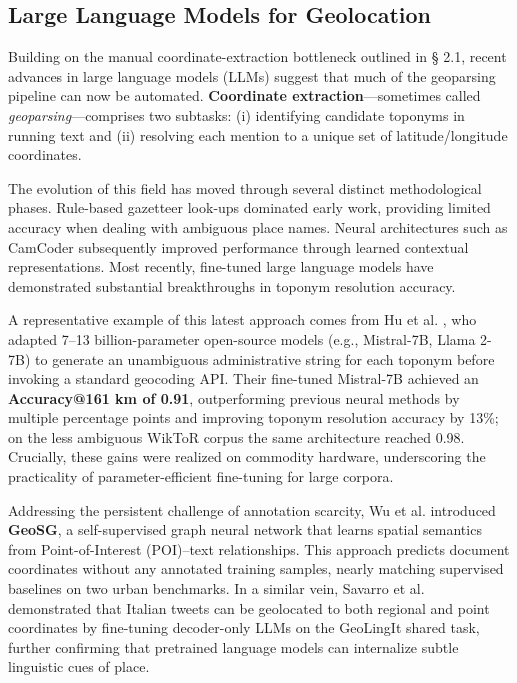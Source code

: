 \subsection{Large Language Models for
Geolocation}\label{large-language-models-for-geolocation}

Building on the manual coordinate-extraction bottleneck outlined in §
2.1, recent advances in large language models (LLMs) suggest that much
of the geoparsing pipeline can now be automated. \textbf{Coordinate
extraction}---sometimes called \emph{geoparsing}---comprises two
subtasks: (i) identifying candidate toponyms in running text and (ii)
resolving each mention to a unique set of latitude/longitude
coordinates.

The evolution of this field has moved through several distinct
methodological phases. Rule-based gazetteer look-ups dominated early
work, providing limited accuracy when dealing with ambiguous place
names. Neural architectures such as CamCoder \citep{Gritta2018_camcoder}
subsequently improved performance through learned contextual
representations. Most recently, fine-tuned large language models have
demonstrated substantial breakthroughs in toponym resolution accuracy.

A representative example of this latest approach comes from Hu et al.
\citep{Hu2024_toponym_llm}, who adapted 7--13 billion-parameter
open-source models (e.g., Mistral-7B, Llama 2-7B) to generate an
unambiguous administrative string for each toponym before invoking a
standard geocoding API. Their fine-tuned Mistral-7B achieved an
\textbf{Accuracy@161 km of 0.91}, outperforming previous neural methods
by multiple percentage points and improving toponym resolution accuracy
by 13\%; on the less ambiguous WikToR corpus the same architecture
reached 0.98. Crucially, these gains were realized on commodity
hardware, underscoring the practicality of parameter-efficient
fine-tuning for large corpora.

Addressing the persistent challenge of annotation scarcity, Wu et al.
\citep{wu2025geosg} introduced \textbf{GeoSG}, a self-supervised graph
neural network that learns spatial semantics from Point-of-Interest
(POI)--text relationships. This approach predicts document coordinates
without any annotated training samples, nearly matching supervised
baselines on two urban benchmarks. In a similar vein, Savarro et al.
\citep{savarro2024geolingit} demonstrated that Italian tweets can be
geolocated to both regional and point coordinates by fine-tuning
decoder-only LLMs on the GeoLingIt shared task, further confirming that
pretrained language models can internalize subtle linguistic cues of
place.

